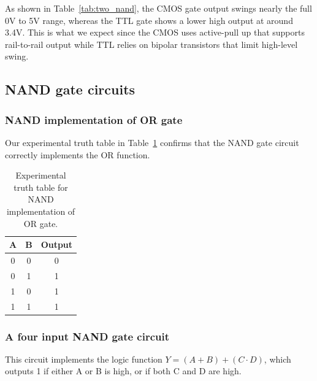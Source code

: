\documentclass{article}
\begin{document}
\noindent As shown in Table~\ref{tab:two_nand}, the CMOS gate output swings nearly the
full 0\si{\volt} to 5\si{\volt} range, whereas the TTL gate shows a lower high
output at around 3.4\si{\volt}. This is what we expect since the CMOS uses active-pull 
up that supports rail-to-rail output while TTL relies on bipolar transistors that 
limit high-level swing.


\subsection{NAND gate circuits}

\subsubsection{NAND implementation of OR gate}

Our experimental truth table in Table~\ref{tab:nand_or} confirms that the NAND 
gate circuit correctly implements the OR function.

\begin{table}[H]
    \centering
    \begin{tabular}{|c|c|c|}
        \hline
        A & B & Output\\
        \hline
        0 & 0 & 0\\
        0 & 1 & 1\\
        1 & 0 & 1\\
        1 & 1 & 1\\
        \hline
    \end{tabular}
    \caption{Experimental truth table for NAND implementation of OR gate.}
    \label{tab:nand_or}
\end{table}

\subsubsection{A four input NAND gate circuit}

This circuit implements the logic function $Y=(A+B)+(C\cdot D)$, which outputs
1 if either A or B is high, or if both C and D are high.
\end{document}
